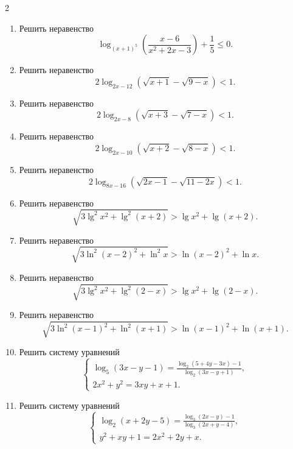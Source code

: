 \documentclass[14pt,a4paper,landscape]{article}
\begin{document}
\begin{multicols}{2}
\begin{enumerate}[label=3.\arabic*, leftmargin=1.5em]
    \item Решить неравенство $$\log_{(x+1)^5}\left(\frac{x-6}{x^2+2x-3}\right) + \frac{1}{5} \leqslant 0.$$
    \item Решить неравенство $$2\log_{2x-12}(\sqrt{x+1} - \sqrt{9-x}) < 1.$$
    \item Решить неравенство $$2\log_{2x-8}(\sqrt{x+3} - \sqrt{7-x}) < 1.$$
    \item Решить неравенство $$2\log_{2x-10}(\sqrt{x+2} - \sqrt{8-x}) < 1.$$
    \item Решить неравенство $$2\log_{8x-16}(\sqrt{2x-1} - \sqrt{11-2x}) < 1.$$
    \item Решить неравенство $$\sqrt{3\lg^2 x^2 + \lg^2(x+2)} > \lg x^2 + \lg(x+2).$$
    \item Решить неравенство $$\sqrt{3\ln^2(x-2)^2 + \ln^2 x} > \ln(x-2)^2 + \ln x.$$
    \item Решить неравенство $$\sqrt{3\lg^2 x^2 + \lg^2(2-x)} > \lg x^2 + \lg(2-x).$$
    \item Решить неравенство $$\sqrt{3\ln^2(x-1)^2 + \ln^2(x+1)} > \ln(x-1)^2 + \ln(x+1).$$
    \item Решить систему уравнений
    $$
    \begin{cases}
    \log_5(3x-y-1) = \frac{\log_2(5+4y-3x)-1}{\log_2(3x-y+1)}, \\
    2x^2+y^2=3xy+x+1.
    \end{cases}
    $$
    \item Решить систему уравнений
    $$
    \begin{cases}
    \log_2(x+2y-5) = \frac{\log_3(2x-y)-1}{\log_3(2x+y-4)}, \\
    y^2+xy+1=2x^2+2y+x.
    \end{cases}
    $$
\end{enumerate}

\end{multicols}
\end{document}
